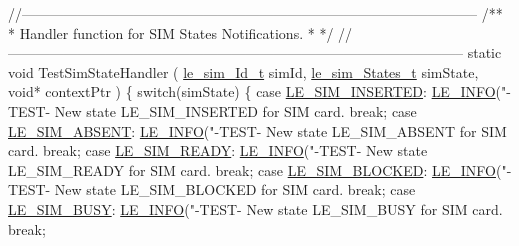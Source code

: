 \begin{DoxyCodeInclude}
{{{\textcolor{comment}{//--------------------------------------------------------------------------------------------------}\textcolor{comment}{}
\textcolor{comment}{/**}
\textcolor{comment}{ * Handler function for SIM States Notifications.}
\textcolor{comment}{ *}
\textcolor{comment}{ */}
\textcolor{comment}{//--------------------------------------------------------------------------------------------------}
\textcolor{keyword}{static} \textcolor{keywordtype}{void} TestSimStateHandler
(
    \hyperlink{le__sim__interface_8h_aace49df88426119626fb1ef4e544ccdd}{le\_sim\_Id\_t}     simId,
    \hyperlink{le__sim__interface_8h_a21b9bb7d5e5e7ece213e00738a5bae41}{le\_sim\_States\_t} simState,
    \textcolor{keywordtype}{void}*           contextPtr
)
\{
    \textcolor{keywordflow}{switch}(simState)
    \{
        \textcolor{keywordflow}{case} \hyperlink{le__sim__interface_8h_a21b9bb7d5e5e7ece213e00738a5bae41a86aea853ae5fcc1a2e3c8d352d8689d3}{LE\_SIM\_INSERTED}:
            \hyperlink{le__log_8h_a23e6d206faa64f612045d688cdde5808}{LE\_INFO}(\textcolor{stringliteral}{"-TEST- New state LE\_SIM\_INSERTED for SIM card.%
            \textcolor{keywordflow}{break};
        \textcolor{keywordflow}{case} \hyperlink{le__sim__interface_8h_a21b9bb7d5e5e7ece213e00738a5bae41a813e26946372fbc3960aa97713b6ca2f}{LE\_SIM\_ABSENT}:
            \hyperlink{le__log_8h_a23e6d206faa64f612045d688cdde5808}{LE\_INFO}(\textcolor{stringliteral}{"-TEST- New state LE\_SIM\_ABSENT for SIM card.%
            \textcolor{keywordflow}{break};
        \textcolor{keywordflow}{case} \hyperlink{le__sim__interface_8h_a21b9bb7d5e5e7ece213e00738a5bae41aa7f1f6c3391e32af8ce3ba2242276d64}{LE\_SIM\_READY}:
            \hyperlink{le__log_8h_a23e6d206faa64f612045d688cdde5808}{LE\_INFO}(\textcolor{stringliteral}{"-TEST- New state LE\_SIM\_READY for SIM card.%
            \textcolor{keywordflow}{break};
        \textcolor{keywordflow}{case} \hyperlink{le__sim__interface_8h_a21b9bb7d5e5e7ece213e00738a5bae41af83b91131d516ad3756781108000515a}{LE\_SIM\_BLOCKED}:
            \hyperlink{le__log_8h_a23e6d206faa64f612045d688cdde5808}{LE\_INFO}(\textcolor{stringliteral}{"-TEST- New state LE\_SIM\_BLOCKED for SIM card.%
            \textcolor{keywordflow}{break};
        \textcolor{keywordflow}{case} \hyperlink{le__sim__interface_8h_a21b9bb7d5e5e7ece213e00738a5bae41a944435801d6359050dc37092396ca951}{LE\_SIM\_BUSY}:
            \hyperlink{le__log_8h_a23e6d206faa64f612045d688cdde5808}{LE\_INFO}(\textcolor{stringliteral}{"-TEST- New state LE\_SIM\_BUSY for SIM card.%
            \textcolor{keywordflow}{break};
}}}}}}}}
\end{DoxyCodeInclude}
